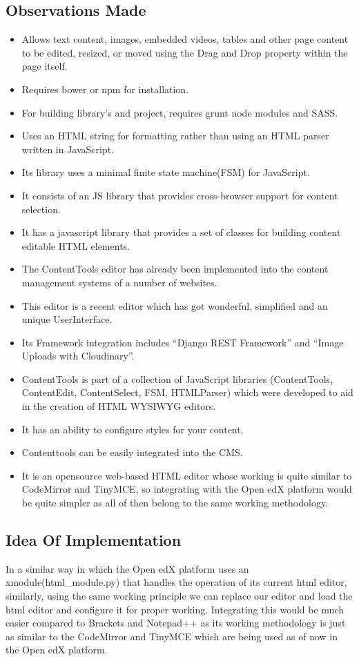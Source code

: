\subsection{Observations Made}
\begin{itemize}
\item Allows text content, images, embedded videos, tables and other page content to be
edited, resized, or moved using the Drag and Drop property within the page itself.
\item Requires bower or npm for installation.
\item For building library’s and project, requires grunt node modules and SASS.
\item Uses an HTML string for formatting rather than using an HTML parser written in
JavaScript.
\item Its library uses a minimal finite state machine(FSM) for JavaScript.
\item It consists of an JS library that provides cross-browser support for content selection.
\item It has a javascript library that provides a set of classes for building content editable
HTML elements.
\item The ContentTools editor has already been implemented into the content management
systems of a number of websites.
\item This editor is a recent editor which has got wonderful, simplified and an unique
UserInterface.
\item Its Framework integration includes “Django REST Framework” and “Image
Uploads with Cloudinary”.
\item ContentTools is part of a collection of JavaScript libraries (ContentTools,
ContentEdit, ContentSelect, FSM, HTMLParser) which were developed to aid in the
creation of HTML WYSIWYG editors.
\item It has an ability to configure styles for your content.
\item Contenttools can be easily integrated into the CMS.
\item It is an opensource web-based HTML editor whose working is quite similar to
CodeMirror and TinyMCE, so integrating with the Open edX platform would be
quite simpler as all of then belong to the same working methodology.
\end{itemize}
\subsection{Idea Of Implementation}
In a similar way in which the Open edX platform uses an xmodule(html\_module.py) that
handles the operation of its current html editor, similarly, using the same working principle
we can replace our editor and load the html editor and configure it for proper working.  \newline
\newline
Integrating this would be much easier compared to Brackets and Notepad++ as its working
methodology is just as similar to the CodeMirror and TinyMCE which are being used as of
now in the Open edX platform. \newline
